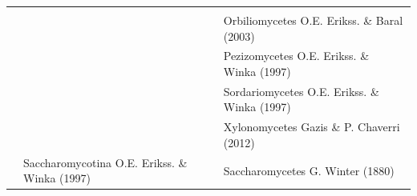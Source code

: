 \documentclass[]{book}
\begin{document}
\begin{longtable}[]{@{}lll@{}}
\begin{minipage}[t]{0.31\columnwidth}
\end{minipage}\tabularnewline
\begin{minipage}[t]{0.32\columnwidth}\raggedright
\strut
\end{minipage} & \begin{minipage}[t]{0.28\columnwidth}\raggedright
\strut
\end{minipage} & \begin{minipage}[t]{0.31\columnwidth}\raggedright
Orbiliomycetes O.E. Erikss. \& Baral (2003)\strut
\end{minipage}\tabularnewline
\begin{minipage}[t]{0.32\columnwidth}\raggedright
\strut
\end{minipage} & \begin{minipage}[t]{0.28\columnwidth}\raggedright
\strut
\end{minipage} & \begin{minipage}[t]{0.31\columnwidth}\raggedright
Pezizomycetes O.E. Erikss. \& Winka (1997)\strut
\end{minipage}\tabularnewline
\begin{minipage}[t]{0.32\columnwidth}\raggedright
\strut
\end{minipage} & \begin{minipage}[t]{0.28\columnwidth}\raggedright
\strut
\end{minipage} & \begin{minipage}[t]{0.31\columnwidth}\raggedright
Sordariomycetes O.E. Erikss. \& Winka (1997)\strut
\end{minipage}\tabularnewline
\begin{minipage}[t]{0.32\columnwidth}\raggedright
\strut
\end{minipage} & \begin{minipage}[t]{0.28\columnwidth}\raggedright
\strut
\end{minipage} & \begin{minipage}[t]{0.31\columnwidth}\raggedright
Xylonomycetes Gazis \& P. Chaverri (2012)\strut
\end{minipage}\tabularnewline
\begin{minipage}[t]{0.32\columnwidth}\raggedright
\strut
\end{minipage} & \begin{minipage}[t]{0.28\columnwidth}\raggedright
Saccharomycotina O.E. Erikss. \& Winka (1997)\strut
\end{minipage} & \begin{minipage}[t]{0.31\columnwidth}\raggedright
Saccharomycetes G. Winter (1880)\strut

\end{minipage}
\end{longtable}
\end{document}

